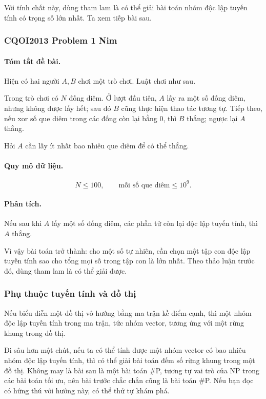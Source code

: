 \documentclass[11pt]{article}
\begin{document}
Với tính chất này, dùng tham lam là có thể giải bài toán nhóm độc lập tuyến tính
có trọng số lớn nhất. Ta xem tiếp bài sau.

\subsubsection{CQOI2013 Problem 1 Nim}

\paragraph{Tóm tắt đề bài.}
Hiện có hai người \(A,B\) chơi một trò chơi. Luật chơi như sau.

Trong trò chơi có \(N\) đống diêm. Ở lượt đầu tiên, \(A\) lấy ra một số đống
diêm, nhưng không được lấy hết; sau đó \(B\) cũng thực hiện thao tác tương tự.
Tiếp theo, nếu xor số que diêm trong các đống còn lại bằng \(0\), thì \(B\)
thắng; ngược lại \(A\) thắng.

Hỏi \(A\) cần lấy ít nhất bao nhiêu que diêm để có thể thắng.

\paragraph{Quy mô dữ liệu.}
\[
  N\le100,\qquad \text{mỗi số que diêm}\le10^9.
\]

\paragraph{Phân tích.}
Nếu sau khi \(A\) lấy một số đống diêm, các phần tử còn lại độc lập tuyến tính,
thì \(A\) thắng.

Vì vậy bài toán trở thành: cho một số tự nhiên, cần chọn một tập con độc lập
tuyến tính sao cho tổng mọi số trong tập con là lớn nhất. Theo thảo luận trước
đó, dùng tham lam là có thể giải được.

\subsubsection{Phụ thuộc tuyến tính và đồ thị}

Nếu biểu diễn một đồ thị vô hướng bằng ma trận kề điểm-cạnh, thì một nhóm độc
lập tuyến tính trong ma trận, tức nhóm vector, tương ứng với một rừng khung
trong đồ thị.

Đi sâu hơn một chút, nếu ta có thể tính được một nhóm vector có bao nhiêu nhóm
độc lập tuyến tính, thì có thể giải bài toán đếm số rừng khung trong một đồ thị.
Không may là bài sau là một bài toán \#P, tương tự vai trò của NP trong các bài
toán tối ưu, nên bài trước chắc chắn cũng là bài toán \#P. Nếu bạn đọc có hứng
thú với hướng này, có thể thử tự khám phá.
\end{document}
